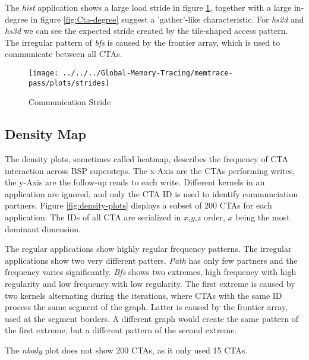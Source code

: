 The \textit{hist} application shows a large load stride in figure \ref{com-stride}, together with a large in-degree in figure \ref{fig:Cta-degree} suggest a 'gather'-like characteristic. For \textit{hs2d} and \textit{hs3d} we can see the expected stride created by the tile-shaped access pattern.
The irregular pattern of \textit{bfs} is caused by the frontier array, which is used to communicate between all CTAs.
\begin{figure}[h!]
	\centering
	\texttt{[image: ../../../Global-Memory-Tracing/memtrace-pass/plots/strides]}
	\caption{Communication Stride}
	\label{com-stride}
\end{figure}
\subsection{Density Map}
The density plots, sometimes called heatmap, describes the frequency of CTA interaction across BSP supersteps. The x-Axis are the CTAs performing writes, the y-Axis are the follow-up reads to each write. Different kernels in an application are ignored, and only the CTA ID is used to identify communciation partners. Figure \ref{fig:density-plots} displays a subset of 200 CTAs for each application. The IDs of all CTA are serialized in $x$,$y$,$z$ order, $x$ being the most dominant dimension. 

The regular applications show highly regular frequency patterns. The irregular applications show two very different patters. \textit{Path} has only few partners and the frequency varies significantly. \textit{Bfs} shows two extremes, high frequency with high regularity and low frequency with low regularity.
The first extreme is caused by two kernels alternating during the iterations, where CTAs with the same ID process the same segment of the graph.  Latter is caused by the frontier array, used at the segment borders. A different graph would create the same pattern of the first extreme, but a different pattern of the second extreme.

The \textit{nbody} plot does not show 200 CTAs, as it only used 15 CTAs.

